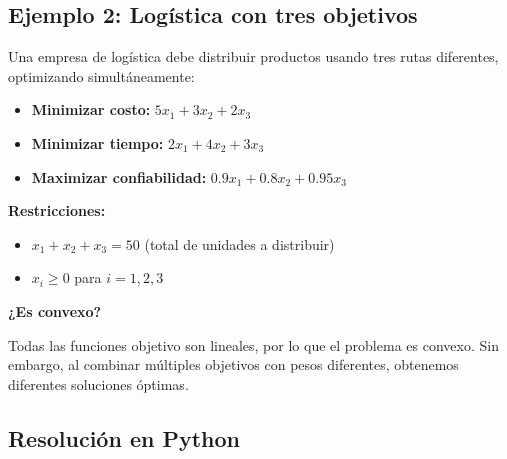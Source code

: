 \documentclass[12pt]{article}
\begin{document}
\subsection{Ejemplo 2: Logística con tres objetivos}

Una empresa de logística debe distribuir productos usando tres rutas diferentes, optimizando simultáneamente:

\begin{itemize}
    \item \textbf{Minimizar costo:} $5x_1 + 3x_2 + 2x_3$
    \item \textbf{Minimizar tiempo:} $2x_1 + 4x_2 + 3x_3$
    \item \textbf{Maximizar confiabilidad:} $0.9x_1 + 0.8x_2 + 0.95x_3$
\end{itemize}

\textbf{Restricciones:}
\begin{itemize}
    \item $x_1 + x_2 + x_3 = 50$ (total de unidades a distribuir)
    \item $x_i \geq 0$ para $i = 1, 2, 3$
\end{itemize}

\vspace{0.3em}

\textbf{¿Es convexo?}

\vspace{0.3em}

Todas las funciones objetivo son lineales, por lo que el problema es convexo. Sin embargo, al combinar múltiples objetivos con pesos diferentes, obtenemos diferentes soluciones óptimas.

\subsection{Resolución en Python}
\end{document}
